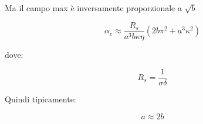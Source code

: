 Ma il campo max è inversamente proporzionale a $\sqrt{b}$ 

{
    \Large 
    \begin{equation}
        \alpha_c \approx 
        \frac{R_s}{a^{3} b \kappa \eta} (2b\pi^{2} + a^{3} \kappa^{2})
    \end{equation}
}

dove: 

{
    \Large 
    \begin{equation}
        R_s = \frac{1}{\sigma \delta}
    \end{equation}
}


Quindi tipicamente: 

{
    \Large
    \begin{equation}
        a \approx 2b
    \end{equation}
}

\newpage 
